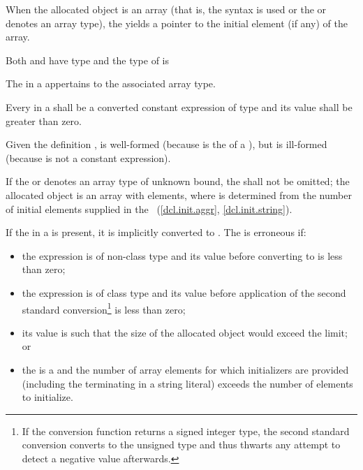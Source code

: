 \pnum
{}%
When the allocated object is an array (that is, the
 syntax is used or the
 or  denotes an array type), the
 yields a pointer to the initial element (if
any) of the array.
\begin{note}
Both  and  have type  and
the type of  is 
\end{note}
The  in a  appertains
to the associated array type.

\pnum
Every  in a
 shall be a converted constant
expression of type  and
its value shall be greater than zero.
\begin{example}
Given the definition ,
 is well-formed (because  is the
 of a ), but
 is ill-formed (because  is not a
constant expression).
\end{example}

\pnum
If the  or 
denotes an array type of unknown bound,
the  shall not be omitted;
the allocated object is an array with  elements,
where  is determined from the number of initial elements
supplied in
the ~(\ref{dcl.init.aggr}, \ref{dcl.init.string}).

\pnum
{}%
If the  in a 
is present, it is implicitly converted to .
%
The  is erroneous if:
\begin{itemize}
\item
the expression is of non-class type and its value before converting to
 is less than zero;

\item
the expression is of class type and its value before application of the second
standard conversion\footnote{If the conversion function
returns a signed integer type, the second standard conversion converts to the
unsigned type  and thus thwarts any attempt to detect a
negative value afterwards.} is less than zero;

\item
its value is such that the size of the allocated object would exceed the
 limit; or

\item
the  is a  and the
number of array elements for which initializers are provided (including the
terminating  in a string literal) exceeds the
number of elements to initialize.
\end{itemize}

